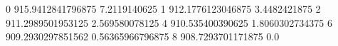 0 915.9412841796875 7.2119140625
1 912.1776123046875 3.4482421875
2 911.2989501953125 2.569580078125
4 910.535400390625 1.8060302734375
6 909.2930297851562 0.56365966796875
8 908.7293701171875 0.0
